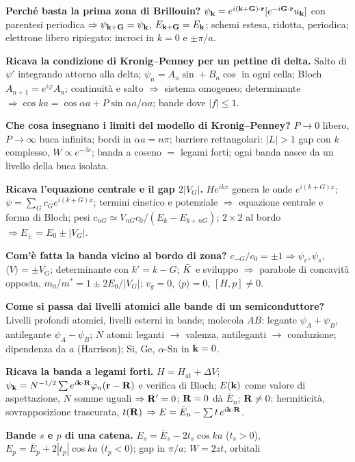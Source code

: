 \documentclass[11pt,a4paper]{article}
\begin{document}
\begin{domande}
\item \textbf{Perché basta la prima zona di Brillouin?} $\psi_{\mathbf k}=e^{i(\mathbf k+\mathbf G)\cdot\mathbf r}[e^{-i\mathbf G\cdot\mathbf r}u_{\mathbf k}]$ con parentesi periodica $\Rightarrow
\psi_{\mathbf k+\mathbf G}=\psi_{\mathbf k}$, $E_{\mathbf k+\mathbf G}=E_{\mathbf k}$; schemi estesa, ridotta, periodica; elettrone libero ripiegato: incroci in $k=0$ e $\pm\pi/a$.
\item \textbf{Ricava la condizione di Kronig--Penney per un pettine di delta.} Salto di $\psi'$ integrando attorno alla delta; $\psi_n=A_n\sin+B_n\cos$ in ogni
cella; Bloch $A_{n+1}=e^{i\varphi}A_n$; continuità e salto $\Rightarrow$ sistema omogeneo; determinante $\Rightarrow\cos ka=\cos\alpha a+P\sin\alpha a/\alpha a$; bande dove $|f|\le1$.
\item \textbf{Che cosa insegnano i limiti del modello di Kronig--Penney?} $P\to0$ libero, $P\to\infty$ buca infinita; bordi in $\alpha a=n\pi$; barriere
rettangolari: $|L|>1$ gap con $k$ complesso, $W\propto e^{-\beta c}$; banda a coseno $=$ legami forti; ogni banda nasce da un livello della buca isolata.
\item \textbf{Ricava l'equazione centrale e il gap $2|V_G|$.} $He^{ikx}$ genera le onde $e^{i(k+G)x}$; $\psi=\sum_Gc_Ge^{i(k+G)x}$; termini cinetico e potenziale
$\Rightarrow$ equazione centrale e forma di Bloch; pesi $c_{nG}\simeq V_{nG}c_0/(E_k-E_{k+nG})$; $2\times2$ al bordo $\Rightarrow E_\pm=E_0\pm|V_G|$.
\item \textbf{Com'è fatta la banda vicino al bordo di zona?} $c_{-G}/c_0=\pm1\Rightarrow\psi_c,\psi_s$, $\langle V\rangle=\pm V_G$; determinante con $k'=k-G$;
$\tilde K$ e sviluppo $\Rightarrow$ parabole di concavità opposta, $m_0/m^*=1\pm2E_0/|V_G|$; $v_g=0$, $\langle p\rangle=0$, $[H,p]\ne0$.
\item \textbf{Come si passa dai livelli atomici alle bande di un semiconduttore?} Livelli profondi atomici, livelli esterni in bande; molecola $AB$: legante
$\psi_A+\psi_B$, antilegante $\psi_A-\psi_B$; $N$ atomi: leganti $\to$ valenza, antileganti $\to$ conduzione; dipendenza da $a$ (Harrison); Si, Ge, $\alpha$-Sn in $\mathbf k=0$.
\item \textbf{Ricava la banda a legami forti.} $H=H_{\mathrm{at}}+\Delta V$; $\psi_{\mathbf k}=N^{-1/2}\sum e^{i\mathbf k\cdot\mathbf R}\varphi_n(\mathbf r-\mathbf R)$ e verifica di Bloch; $E(\mathbf k)$ come
valore di aspettazione, $N$ somme uguali $\Rightarrow\mathbf R'=0$; $\mathbf R=0$ dà $\bar E_n$; $\mathbf R\ne0$: hermiticità, sovrapposizione trascurata, $t(\mathbf R)$
$\Rightarrow E=\bar E_n-\sum t\,e^{i\mathbf k\cdot\mathbf R}$.
\item \textbf{Bande $s$ e $p$ di una catena.} $E_s=\bar E_s-2t_s\cos ka$ ($t_s>0$), $E_p=\bar E_p+2|t_p|\cos ka$ ($t_p<0$); gap in $\pi/a$; $W=2zt$, orbitali

\end{domande}
\end{document}
